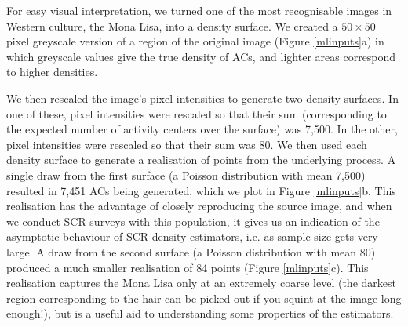 \documentclass[useAMS,usenatbib,referee]{biom}
\begin{document}
For easy visual interpretation, we turned one of the most recognisable images in Western culture, the Mona Lisa, into a density surface. We created a $50 \times 50$ pixel greyscale version of a region of the original image (Figure \ref{mlinputs}a) in which greyscale values give the true density of ACs, and lighter areas correspond to higher densities.

We then rescaled the image's pixel intensities to generate two density surfaces. In one of these, pixel intensities were rescaled so that their sum (corresponding to the expected number of activity centers over the surface) was 7,500. In the other, pixel intensities were rescaled so that their sum was 80. We then used each density surface to generate a realisation of points from the underlying process. A single draw from the first surface (a Poisson distribution with mean 7,500) resulted in 7,451 ACs being generated, which we plot in Figure \ref{mlinputs}b. This realisation has the advantage of closely reproducing the source image, and when we conduct SCR surveys with this population, it gives us an indication of the asymptotic behaviour of SCR density estimators, i.e. as sample size gets very large. A draw from the second surface (a Poisson distribution with mean 80) produced a much smaller realisation of 84 points (Figure \ref{mlinputs}c). This realisation captures the Mona Lisa only at an extremely coarse level (the darkest region corresponding to the hair can be picked out if you squint at the image long enough!), but is a useful aid to understanding some properties of the estimators.

\end{document}
